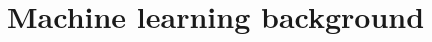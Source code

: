 \documentclass[
aps,
pra,
linenumbers,
floatfix,
]{revtex4-2}
\theoremstyle{plain}
\theoremstyle{definition}
\begin{document}


%


\onecolumngrid
\appendix

\section{Machine learning background}

\end{document}
